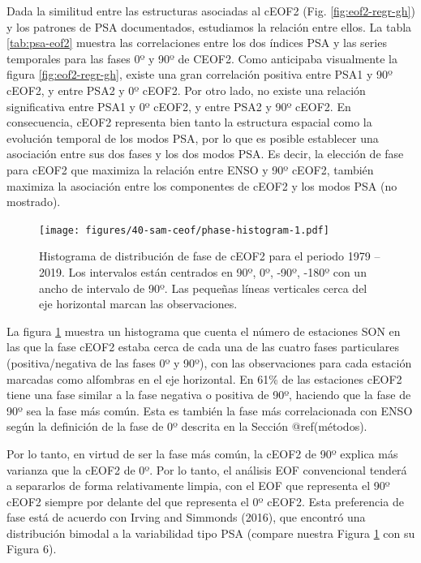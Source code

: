 \documentclass[12pt,oneside]{reedthesis}
\begin{document}
Dada la similitud entre las estructuras asociadas al cEOF2 (Fig. \ref{fig:eof2-regr-gh}) y los patrones de PSA documentados, estudiamos la relación entre ellos.
La tabla \ref{tab:psa-eof2} muestra las correlaciones entre los dos índices PSA y las series temporales para las fases 0º y 90º de CEOF2.
Como anticipaba visualmente la figura \ref{fig:eof2-regr-gh}, existe una gran correlación positiva entre PSA1 y 90º cEOF2, y entre PSA2 y 0º cEOF2.
Por otro lado, no existe una relación significativa entre PSA1 y 0º cEOF2, y entre PSA2 y 90º cEOF2.
En consecuencia, cEOF2 representa bien tanto la estructura espacial como la evolución temporal de los modos PSA, por lo que es posible establecer una asociación entre sus dos fases y los dos modos PSA.
Es decir, la elección de fase para cEOF2 que maximiza la relación entre ENSO y 90º cEOF2, también maximiza la asociación entre los componentes de cEOF2 y los modos PSA (no mostrado).




\begin{figure}
\centering
\texttt{[image: figures/40-sam-ceof/phase-histogram-1.pdf]}
\caption{\label{fig:phase-histogram}Histograma de distribución de fase de cEOF2 para el periodo 1979 -- 2019. Los intervalos están centrados en 90º, 0º, -90º, -180º con un ancho de intervalo de 90º.
Las pequeñas líneas verticales cerca del eje horizontal marcan las observaciones.}
\end{figure}

La figura \ref{fig:phase-histogram} muestra un histograma que cuenta el número de estaciones SON en las que la fase cEOF2 estaba cerca de cada una de las cuatro fases particulares (positiva/negativa de las fases 0º y 90º), con las observaciones para cada estación marcadas como alfombras en el eje horizontal.
En 61\% de las estaciones cEOF2 tiene una fase similar a la fase negativa o positiva de 90º, haciendo que la fase de 90º sea la fase más común.
Esta es también la fase más correlacionada con ENSO según la definición de la fase de 0º descrita en la Sección @ref(métodos).

Por lo tanto, en virtud de ser la fase más común, la cEOF2 de 90º explica más varianza que la cEOF2 de 0º.
Por lo tanto, el análisis EOF convencional tenderá a separarlos de forma relativamente limpia, con el EOF que representa el 90º cEOF2 siempre por delante del que representa el 0º cEOF2.
Esta preferencia de fase está de acuerdo con Irving and Simmonds (2016), que encontró una distribución bimodal a la variabilidad tipo PSA (compare nuestra Figura \ref{fig:phase-histogram} con su Figura 6).
\end{document}
